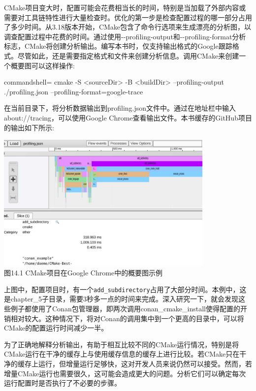 CMake项目变大时，配置可能会花费相当长的时间，特别是当加载了外部内容或需要对工具链特性进行大量检查时。优化的第一步是检查配置过程的哪一部分占用了多少时间。从3.18版本开始，CMake包含了命令行选项来生成漂亮的分析图，以调查配置过程中花费的时间。通过使用-{}-profiling-output和-{}-profiling-format分析标志，CMake将创建分析输出。编写本书时，仅支持输出格式的Google跟踪格式。尽管如此，还是需要指定格式和文件来创建分析信息。调用CMake来创建一个概要图可以这样操作:

\begin{tcblisting}{commandshell={}}
cmake -S <sourceDir> -B <buildDir> --profiling-output
  ./profiling.json --profiling-format=google-trace
\end{tcblisting}

在当前目录下，将分析数据输出到profiling.json文件中。通过在地址栏中输入about://tracing，可以使用Google Chrome查看输出文件。本书缓存的GitHub项目的输出如下所示:

\begin{center}
\includegraphics[width=0.8\textwidth]{content/3/chapter14/images/1.jpg}\\
图14.1  CMake项目在Google Chrome中的概要图示例
\end{center}

上图中，配置项目时，有一个\texttt{add\_subdirectory}占用了大部分时间。本例中，这是chapter\_5子目录，需要3秒多一点的时间来完成。深入研究一下，就会发现这些例子都使用了Conan包管理器，即两次调用conan\_cmake\_install使得配置的开销相对较大。这种情况下，将对Conan的调用集中到一个更高的目录中，可以将CMake的配置运行时间减少一半。

为了正确地解释分析输出，有助于相互比较不同的CMake运行情况，特别是将CMake运行在干净的缓存上与使用缓存信息的缓存上进行比较。若CMake只在干净的缓存上运行，但增量运行足够快，这对开发人员来说仍然可以接受。然而，若增量CMake运行也需要很久，这可能会造成更大的问题。分析它们可以确定每次运行配置时是否执行了不必要的步骤。

